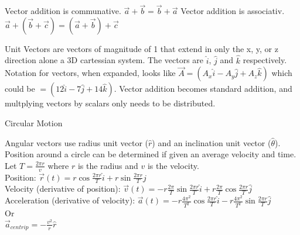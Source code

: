\documentclass{article}
\begin{document}
\noindent
Vector addition is communative. $\vec{a} + \vec{b} = \vec{b} + \vec{a}$
Vector addition is associativ. $\vec{a} + (\vec{b} + \vec{c}) = (\vec{a} + \vec{b}) + \vec{c}$

\indent
Unit Vectors are vectors of magnitude of 1 that extend in only the x, y, or z direction alone a 3D cartessian system. The vectors are $\hat{i}$, $\hat{j}$ and $\hat{k}$ respectively. Notation for vectors, when expanded, looks like $\vec{A} = (A_x\hat{i} - A_y\hat{j} + A_z\hat{k})$ which could be $=(12\hat{i} - 7\hat{j} + 14\hat{k})$. Vector addition becomes standard addition, and multplying vectors by scalars only needs to be distributed.

\noindent
\Large
Circular Motion\\
\normalsize
\noindent

Angular vectors use radius unit vector ($\hat{r}$) and an inclination unit vector ($\hat{\theta}$). Position around a circle can be determined if given an average velocity and time.\\
Let $T = \frac{2\pi r}{v}$ where $r$ is the radius and $v$ is the velocity.\\
Position: $\vec{r}(t) = r\cos{\frac{2\pi r}{T}}\hat{i} + r\sin{\frac{2\pi r}{T}}\hat{j}$\\
Velocity (derivative of position): $\vec{v}(t) = -r\frac{2\pi}{T}\sin{\frac{2\pi r}{T}}\hat{i} + r\frac{2\pi}{T}\cos{\frac{2\pi r}{T}}\hat{j}$\\
Acceleration (derivative of velocity): $\vec{a}(t) = -r\frac{4\pi^2}{T^2}\cos{\frac{2\pi r}{T}}\hat{i} - r\frac{4\pi^2}{T^2}\sin{\frac{2\pi r}{T}}\hat{j}$\\
Or\\
$\vec{a}_{centrip} = -\frac{v^2}{r}\hat{r}$
\end{document}

